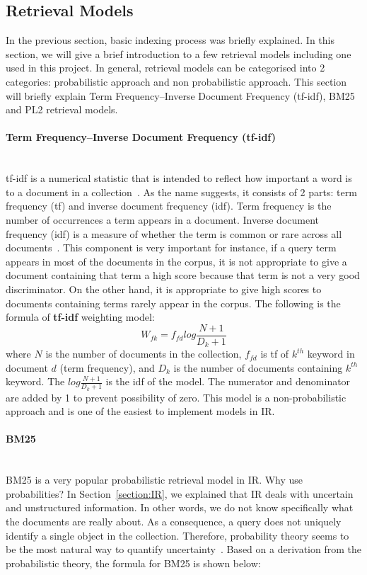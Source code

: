 \subsection{Retrieval Models}\label{section:retrievalmodel}
In the previous section, basic indexing process was briefly explained. In this section, we will give a brief introduction to a few retrieval models including one
used in this project. In general, retrieval models can be categorised into 2 categories: probabilistic approach and non probabilistic approach.
This section will briefly explain Term Frequency–Inverse Document Frequency (tf-idf), BM25 and PL2 retrieval models.

\paragraph{Term Frequency–Inverse Document Frequency (tf-idf)} \hspace{0pt} \\
\indent tf-idf is a numerical statistic that is intended to reflect how important a word is to a document in a collection~\cite{tfidf}. As the name suggests, it consists
of 2 parts: term frequency (tf) and inverse document frequency (idf). Term frequency is the number of occurrences a term appears in a document.
Inverse document frequency (idf) is a measure of whether the term is common or rare across all documents~\cite{tfidf}.
This component is very important for instance, if a query term appears in most of the documents in the corpus, it is not appropriate to give a 
document containing that term a high score because that term is not a very good discriminator. On the other hand, it is appropriate to give high scores to 
documents containing terms rarely appear in the corpus.
The following is the formula of \textbf{tf-idf} weighting model:
\begin{equation}\label{eq:tfidf}
W_{fk} = f_{fd}log \frac{N + 1}{D_k + 1}
\end{equation}
where $N$ is the number of documents in the collection, $f_{fd}$ is tf of ${k^{th}}$ keyword in document $d$ (term frequency),
and $D_k$ is the number of documents containing ${k^{th}}$ keyword. The $log \frac{N + 1}{D_k + 1}$ is the idf of the model.
The numerator and denominator are added by 1 to prevent possibility of zero.
This model is a non-probabilistic approach and is one of the easiest to implement models in IR.

\paragraph{BM25} \hspace{0pt} \\
BM25 is a very popular probabilistic retrieval model in IR. Why use probabilities? 
In Section~\ref{section:IR}, we explained that IR deals with uncertain and unstructured information. In other words, we do not know specifically
what the documents are really about. As a consequence, a query does not uniquely identify a single object in the collection. Therefore, probability theory
seems to be the most natural way to quantify uncertainty~\cite[P. 7]{probModel}. Based on a derivation from the probabilistic theory, the formula
for BM25 is shown below:

